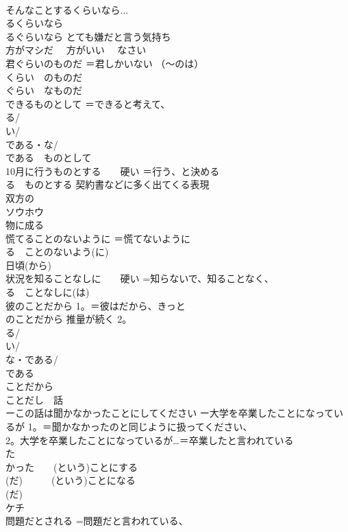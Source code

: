 \documentclass[8pt]{extreport}
\begin{document}
\begin{CJK}{UTF8}{min}
\\	そんなことするくらいなら...	
\\	るくらいなら 
\\	るぐらいなら とても嫌だと言う気持ち 
\\	方がマシだ 　方がいい 　なさい
\\	君ぐらいのものだ	＝君しかいない （〜のは）
\\	くらい　のものだ 　　　　　
\\	ぐらい　なものだ
\\	できるものとして	＝できると考えて、
\\	る/
\\	い/
\\	である・な/
\\	である　ものとして
\\	10月に行うものとする　　硬い	＝行う、と決める 
\\	る　ものとする 契約書などに多く出てくる表現
\\	双方の
\\	ソウホウ 
\\	物に成る	
\\	慌てることのないように	＝慌てないように 
\\	る　ことのないよう(に)
\\	日頃(から)	
\\	状況を知ることなしに　　硬い	=知らないで、知ることなく、
\\	る　ことなしに(は)
\\	彼のことだから	1。＝彼はだから、きっと 
\\	のことだから 推量が続く 2。
\\	る/
\\	い/
\\	な・である/
\\	である　 
\\	ことだから 
\\	ことだし　話
\\	ーこの話は聞かなかったことにしてください ー大学を卒業したことになっているが	1。＝聞かなかったのと同じように扱ってください、
\\	2。大学を卒業したことになっているが…＝卒業したと言われている 
\\	た 
\\	かった　　(という)ことにする 
\\	(だ)　　　(という)ことになる 
\\	(だ)
\\	ケチ	
\\	問題だとされる	=問題だと言われている、

\end{CJK}
\end{document}
